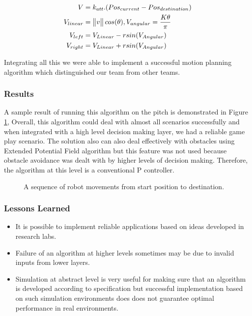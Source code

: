 \begin{align}
V & =k_{att}.(Pos_{current}-Pos_{destination})\\
V_{linear} &= \begin{Vmatrix}v\end{Vmatrix} cos(\theta) ,
V_{angular} = {K\theta \over \pi}\\
V_{left}&=V_{Linear}-rsin(V_{Angular})\\
V_{right}&=V_{Linear}+rsin(V_{Angular})
\end{align}

Integrating all this we were able to implement a successful motion planning algorithm which distinguished our team from other teams.\linebreak

\subsubsection{Results}
A sample result of running this algorithm on the pitch is demonstrated in Figure \ref{fig:seq}, Overall, this algorithm could deal with almost all scenarios successfully and when integrated with a high level decision making layer, we had a reliable game play scenario. 
The solution also can also deal effectively with obstacles using Extended Potential Field algorithm\cite{paper:OKhatib} but this feature was not used because obstacle avoidance was dealt with by higher levels of decision making. Therefore, the algorithm at this level is a conventional P controller.  

\begin{figure}[!bp]
\begin{center}
\caption{A sequence of robot movements from start position to destination.}
\label{fig:seq}
\end{center}
\end{figure}

\subsubsection{Lessons Learned}

\begin{itemize}
\item It is possible to implement reliable applications based on ideas developed in research labs. 
\item Failure of an algorithm at higher levels sometimes may be due to invalid inputs from lower layers.
\item Simulation at abstract level is very useful for making sure that an algorithm is developed according to specification but successful implementation based on such simulation environments does does not guarantee optimal performance in real environments.
\end{itemize}